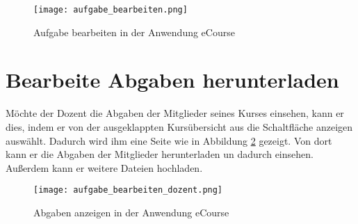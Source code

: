 \begin{figure}[h]
\centering
\texttt{[image: aufgabe\_bearbeiten.png]}
\caption{Aufgabe bearbeiten in der Anwendung eCourse}
\label{fib:aufgabe_bearbeiten}
\end{figure}

\section{Bearbeite Abgaben herunterladen}
\label{sec:herunterladen}
Möchte der Dozent die Abgaben der Mitglieder seines Kurses einsehen, kann er dies, indem er von der ausgeklappten Kursübersicht aus die Schaltfläche \glqq anzeigen\grqq{} auswählt. Dadurch wird ihm eine Seite wie in Abbildung \ref{fib:aufgabe_bearbeiten} gezeigt. Von dort kann er die Abgaben der Mitglieder herunterladen un dadurch einsehen. Außerdem kann er weitere Dateien hochladen.

\begin{figure}[h]
\centering
\texttt{[image: aufgabe\_bearbeiten\_dozent.png]}
\caption{Abgaben anzeigen in der Anwendung eCourse}
\label{fib:aufgabe_bearbeiten}
\end{figure}

